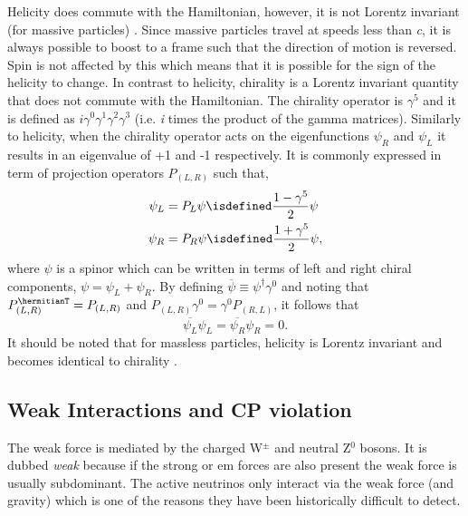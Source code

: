 Helicity does commute with the Hamiltonian, however, it is not Lorentz invariant (for massive particles) \cite{Introduction_to_Particle_and_Astroparticle_Physics_book}. Since massive particles travel at speeds less than \textit{c}, it is always possible to boost to a frame such that the direction of motion is reversed. Spin is not affected by this which means that it is possible for the sign of the helicity to change. In contrast to helicity, chirality is a Lorentz invariant quantity that does not commute with the Hamiltonian. The chirality operator is $\gamma^5$ and it is defined as $i\gamma^0\gamma^1\gamma^2\gamma^3$ (i.e. \textit{i} times the product of the gamma matrices). Similarly to helicity, when the chirality operator acts on the eigenfunctions $\psi_R$ and $\psi_L$ it results in an eigenvalue of +1 and -1 respectively. It is commonly expressed in term of projection operators $P_{(L, R)}$ such that,
\begin{equation}
\begin{split}
    \psi_L &= P_L\psi \isdefined \frac{1-\gamma^5}{2}\psi \\
    \psi_R &= P_R\psi \isdefined \frac{1+\gamma^5}{2}\psi,
\end{split}
\end{equation}
where $\psi$ is a spinor which can be written in terms of left and right chiral components, $\psi = \psi_L + \psi_R$.
By defining $\overline{\psi} \equiv \psi^\dag \gamma^0$ and noting that $P_{(L,R)}^\hermitianT = P_{(L,R)}$ and $P_{(L,R)}\gamma^0 = \gamma^0P_{(R,L)}$, it follows that
\begin{equation}\label{eqn:chiral identity}
    \overline{\psi_L}\psi_L = \overline{\psi_R}\psi_R = 0.
\end{equation}
It should be noted that for massless particles, helicity is Lorentz invariant and becomes identical to chirality \cite{Fundamentals_of_Neutrino_Physics_and_Astrophysics}.

\subsection{Weak Interactions and CP violation}

The weak force is mediated by the charged W$^\pm$ and neutral Z$^0$ bosons. It is dubbed \textit{weak} because if the strong or \gls{em} forces are also present the weak force is usually subdominant. The active neutrinos only interact via the weak force (and gravity) which is one of the reasons they have been historically difficult to detect. 

